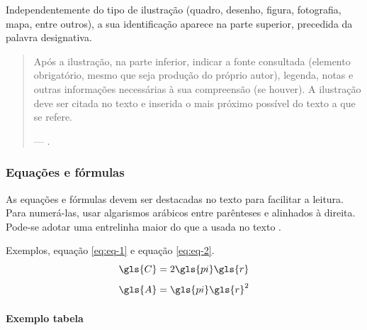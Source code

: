 \documentclass[
	12pt,				%
	oneside,			%
	a4paper,			%
	chapter=TITLE,		%
	section=TITLE,		%
	english,			%
	brazil				%
	]{abntex2}
\begin{document}
Independentemente do tipo de ilustração (quadro, desenho, figura, fotografia,
mapa, entre outros), a sua identificação aparece na parte superior, precedida da
palavra designativa.
\begin{quote}
Após a ilustração, na parte inferior, indicar a fonte consultada (elemento
obrigatório, mesmo que seja produção do próprio autor), legenda, notas e outras
informações necessárias à sua compreensão (se houver). A ilustração deve ser
citada no texto e inserida o mais próximo possível do texto a que se refere.

--- \autocite[11]{NBR14724:2011}.
\end{quote}
\hypertarget{equauxe7uxf5es-e-fuxf3rmulas}{%
\subsubsection{Equações e fórmulas}\label{equauxe7uxf5es-e-fuxf3rmulas}}

As equações e fórmulas devem ser destacadas no texto para facilitar a leitura.
Para numerá-las, usar algarismos arábicos entre parênteses e alinhados à direita.
Pode-se adotar uma entrelinha maior do que a usada no texto \autocite{NBR14724:2011}.

Exemplos, equação \eqref{eq:eq-1} e equação \eqref{eq:eq-2}.
\begin{equation}
  \gls{C} = 2 \gls{pi} \gls{r}
  \label{eq:eq-1}
\end{equation}
\begin{equation}
  \gls{A} = \gls{pi} \gls{r}^2
  \label{eq:eq-2}
\end{equation}
\hypertarget{exemplo-tabela}{%
\paragraph{Exemplo tabela}\label{exemplo-tabela}}
\end{document}
